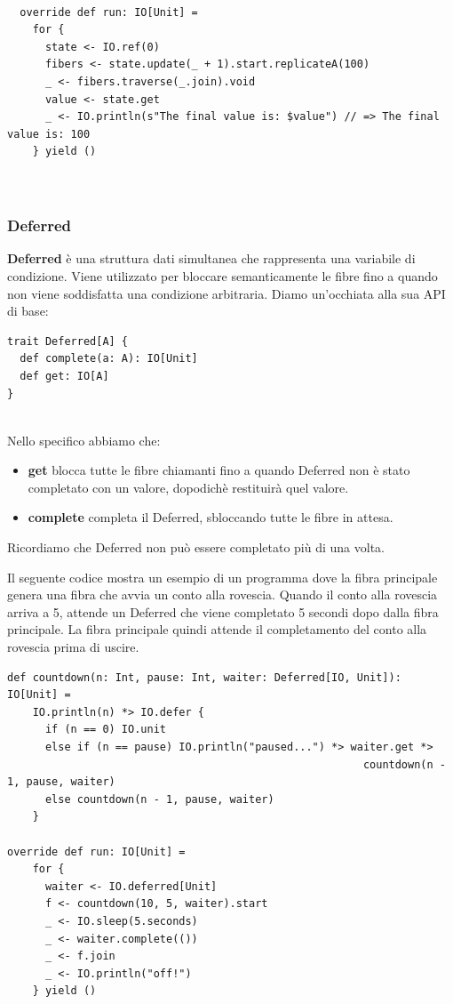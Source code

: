 \begin{verbatim}

  override def run: IO[Unit] =
    for {
      state <- IO.ref(0)
      fibers <- state.update(_ + 1).start.replicateA(100)
      _ <- fibers.traverse(_.join).void
      value <- state.get
      _ <- IO.println(s"The final value is: $value") // => The final value is: 100
    } yield ()

    
\end{verbatim}

\subsubsection{Deferred}
\textbf{Deferred} è una struttura dati simultanea che rappresenta una variabile di condizione. Viene utilizzato per bloccare semanticamente le fibre fino a quando non viene soddisfatta una condizione arbitraria. Diamo un'occhiata alla sua API di base:

\begin{verbatim}
trait Deferred[A] {
  def complete(a: A): IO[Unit]
  def get: IO[A]
}
    
\end{verbatim}
\noindent Nello specifico abbiamo che:
\begin{itemize}
    \item \textbf{get} blocca tutte le fibre chiamanti fino a quando Deferred non è stato completato con un valore, dopodichè restituirà quel valore.
    \item \textbf{complete} completa il Deferred, sbloccando tutte le fibre in attesa.
\end{itemize}
\noindent Ricordiamo che Deferred non può essere completato più di una volta.

\noindent Il seguente codice mostra un esempio di un programma dove la fibra principale genera una fibra che avvia un conto alla rovescia. Quando il conto alla rovescia arriva a 5, attende un Deferred che viene completato 5 secondi dopo dalla fibra principale. La fibra principale quindi attende il completamento del conto alla rovescia prima di uscire. 

\begin{verbatim}
def countdown(n: Int, pause: Int, waiter: Deferred[IO, Unit]): IO[Unit] = 
    IO.println(n) *> IO.defer {
      if (n == 0) IO.unit
      else if (n == pause) IO.println("paused...") *> waiter.get *> 
                                                        countdown(n - 1, pause, waiter)
      else countdown(n - 1, pause, waiter)
    } 

override def run: IO[Unit] =
    for {
      waiter <- IO.deferred[Unit]
      f <- countdown(10, 5, waiter).start
      _ <- IO.sleep(5.seconds)
      _ <- waiter.complete(())
      _ <- f.join
      _ <- IO.println("off!")
    } yield ()
\end{verbatim}

